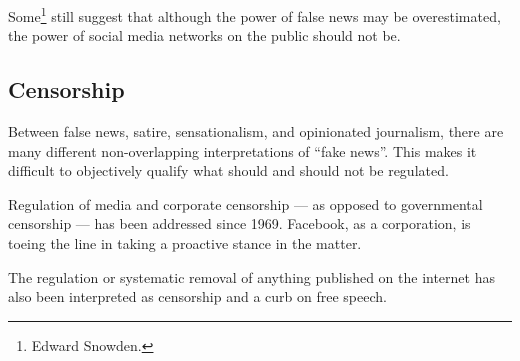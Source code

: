 \par Some\footnote{Edward Snowden.} still suggest that although the power of false news may be overestimated, the power of social media networks on the public should not be. \cite{tc_snowden_fb}

\subsection{Censorship}

\par Between false news, satire, sensationalism, and opinionated journalism, there are many different non-overlapping interpretations of ``fake news''. \cite{npr_fake_news} This makes it difficult to objectively qualify what should and should not be regulated.

\par Regulation of media and corporate censorship --- as opposed to governmental censorship --- has been addressed since 1969. \cite{silent_screen} Facebook, as a corporation, is toeing the line in taking a proactive stance in the matter.

\par The regulation or systematic removal of anything published on the internet has also been interpreted as censorship and a curb on free speech. \cite{eff_cali_bill_distrastrous}

%
\vfill